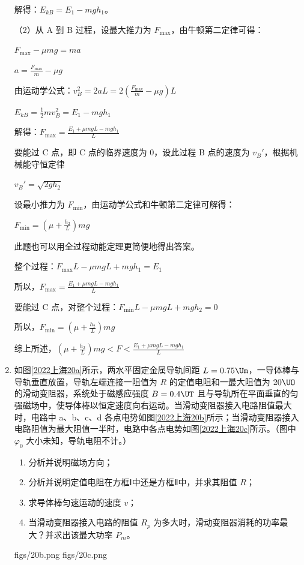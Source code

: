 \documentclass[\gkver]{gaokaozhenti}
\begin{document}
\begin{enumerate}
{解得：$E_{kB}=E_{1}-mgh_{1}$。

（2）从 A 到 B 过程，设最大推力为 $F_{\text{max}}$，由牛顿第二定律可得：

$F_{\text{max}}-\mu mg=ma$

$a=\frac{F_{\text{max}}}{m}-\mu g$

由运动学公式：$v_{B}^{2}=2aL=2\left(\frac{F_{\text{max}}}{m}-\mu g\right)L$

$E_{kB}=\frac{1}{2}mv_{B}^{2}=E_{1}-mgh_{1}$

解得：$F_{\text{max}}=\frac{E_{1}+\mu mgL-mgh_{1}}{L}$

要能过 C 点，即 C 点的临界速度为 0，设此过程 B 点的速度为 $v_{B}'$，根据机械能守恒定律

$v_{B}'=\sqrt{2gh_{2}}$

设最小推力为 $F_{\text{min}}$，由运动学公式和牛顿第二定律可解得：

$F_{\text{min}}=\left(\mu+\frac{h_{2}}{L}\right)mg$

此题也可以用全过程动能定理更简便地得出答案。

整个过程：$F_{\text{max}}L-\mu mgL+mgh_{1}=E_{1}$

所以，$F_{\text{max}}=\frac{E_{1}+\mu mgL-mgh_{1}}{L}$

要能过 C 点，对整个过程：$F_{\text{min}}L-\mu mgL+mgh_{2}=0$

所以，$F_{\text{min}}=\left(\mu+\frac{h_{2}}{L}\right)mg$

综上所述，$\left(\mu+\frac{h_{2}}{L}\right)mg<F<\frac{E_{1}+\mu mgL-mgh_{1}}{L}$
}

\item
如图\ref{2022上海20a}所示，两水平固定金属导轨间距 $L=0.75 \Um$，一导体棒与导轨垂直放置，导轨左端连接一阻值为 $R$ 的定值电阻和一最大阻值为 $20 \UO$ 的滑动变阻器，系统处于磁感应强度 $B=0.4 \UT$ 且与导轨所在平面垂直的匀强磁场中，使导体棒以恒定速度向右运动。当滑动变阻器接入电路阻值最大时，电路中 a、b、c、d 各点电势如图\ref{2022上海20b}所示；当滑动变阻器接入电路阻值为最大阻值一半时，电路中各点电势如图\ref{2022上海20c}所示。（图中 $\varphi_{0}$ 大小未知，导轨电阻不计。）
\begin{enumerate}
	\item
	分析并说明磁场方向；
	\item
	分析并说明定值电阻在方框Ⅰ中还是方框Ⅱ中，并求其阻值 $R$；
	\item
	求导体棒匀速运动的速度 $v$；
	\item
	当滑动变阻器接入电路的阻值 $R_{p}$ 为多大时，滑动变阻器消耗的功率最大？并求出该最大功率 $P_{m}$。
\end{enumerate}
\threepicture[labelA=2022上海20a, labelB=2022上海20b, labelC=2022上海20c, align=right, wA=5.00cm, wB=6.00cm, wC=7.00cm]
{}
{figs/20b.png}
{figs/20c.png}
\end{enumerate}
\end{document}
